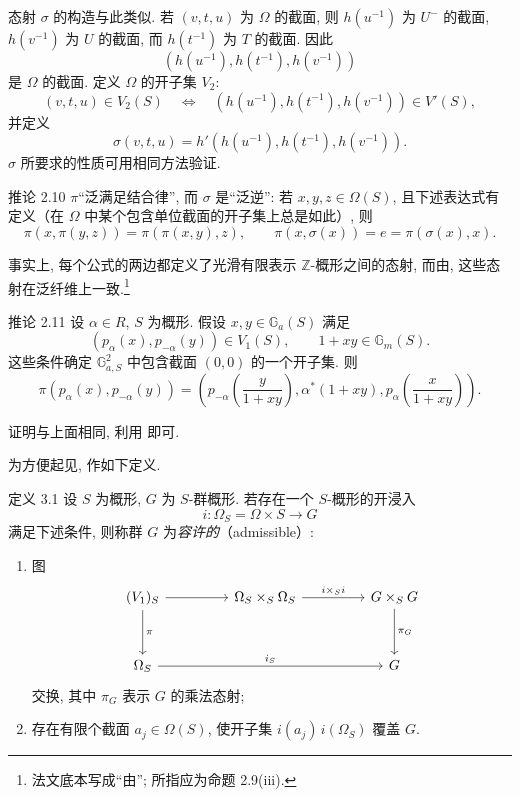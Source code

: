 态射 \(\sigma\) 的构造与此类似. 若 \((v,t,u)\) 为 \(\Omega\) 的截面, 则 \(h(u^{-1})\) 为 \(U^-\) 的截面, \(h(v^{-1})\) 为 \(U\) 的截面, 而 \(h(t^{-1})\) 为 \(T\) 的截面. 因此
\[
 (h(u^{-1}),h(t^{-1}),h(v^{-1}))
\]
是 \(\Omega\) 的截面. 定义 \(\Omega\) 的开子集 \(V_2\):
\[
 (v,t,u)\in V_2(S)
 \quad\Longleftrightarrow\quad
 (h(u^{-1}),h(t^{-1}),h(v^{-1}))\in V'(S),
\]
并定义
\[
 \sigma(v,t,u)=h'(h(u^{-1}),h(t^{-1}),h(v^{-1})).
\]
\(\sigma\) 所要求的性质可用相同方法验证.

\begin{sgastatement}{推论 2.10}
\(\pi\)“泛满足结合律”, 而 \(\sigma\) 是“泛逆”: 若 \(x,y,z\in\Omega(S)\), 且下述表达式有定义（在 \(\Omega\) 中某个包含单位截面的开子集上总是如此）, 则
\[
 \pi(x,\pi(y,z))=\pi(\pi(x,y),z),\qquad
 \pi(x,\sigma(x))=e=\pi(\sigma(x),x).
\]
\end{sgastatement}

事实上, 每个公式的两边都定义了光滑有限表示 \(\mathbb Z\)-概形之间的态射, 而由, 这些态射在泛纤维上一致.\footnote{法文底本写成“由”; 所指应为命题 2.9(iii).}

\begin{sgastatement}{推论 2.11}
设 \(\alpha\in R\), \(S\) 为概形. 假设 \(x,y\in\mathbb G_a(S)\) 满足
\[
 (p_\alpha(x),p_{-\alpha}(y))\in V_1(S),
 \qquad 1+xy\in\mathbb G_m(S).
\]
这些条件确定 \(\mathbb G_{a,S}^2\) 中包含截面 \((0,0)\) 的一个开子集. 则
\[
 \pi(p_\alpha(x),p_{-\alpha}(y))
 =
 \left(
 p_{-\alpha}\!\left(\frac{y}{1+xy}\right),
 \alpha^\ast(1+xy),
 p_\alpha\!\left(\frac{x}{1+xy}\right)
 \right).
\]
\end{sgastatement}

证明与上面相同, 利用 即可.


为方便起见, 作如下定义.

\begin{sgastatement}{定义 3.1}
设 \(S\) 为概形, \(G\) 为 \(S\)-群概形. 若存在一个 \(S\)-概形的开浸入
\[
 i\colon\Omega_S=\Omega\times S\longrightarrow G
\]
满足下述条件, 则称群 \(G\) 为\emph{容许的}（admissible）:
\begin{enumerate}[label=\textup{(\roman*)},leftmargin=2.2em]
\item 图
\[
\begin{tikzcd}[column sep=4.5em,row sep=3.2em]
(V_1)_S
  \arrow[r]
  \arrow[d,"\pi"]
&
\Omega_S\times_S\Omega_S
  \arrow[r,"i\times_S i"]
&
G\times_SG
  \arrow[d,"\pi_G"]
\\
\Omega_S
  \arrow[rr,"i_S"]
&&
G
\end{tikzcd}
\]
交换, 其中 \(\pi_G\) 表示 \(G\) 的乘法态射;
\item 存在有限个截面 \(a_j\in\Omega(S)\), 使开子集 \(i(a_j)\,i(\Omega_S)\) 覆盖 \(G\).
\end{enumerate}
\end{sgastatement}

